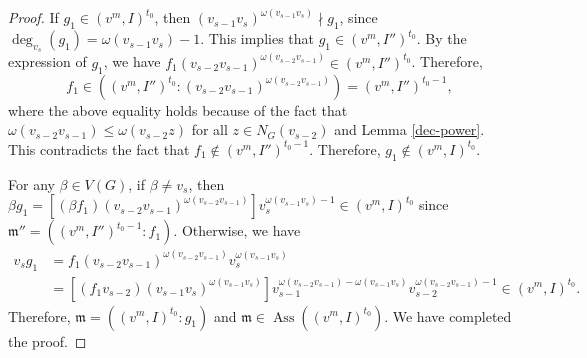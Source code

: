 \documentclass[12pt,amscd]{amsart}
\DeclareMathOperator{\ass}{Ass}
\theoremstyle{definition}
\def\m {\mathfrak m}
\begin{document}
\begin{proof}
If  $g_1\in (v^m,I)^{t_0}$, then  $(v_{s-1}v_{s})^{\omega(v_{s-1}v_{s})}\nmid g_1$, since  $\deg_{v_{s}}(g_1) = \omega(v_{s-1}v_{s})-1$. This implies that  $g_1 \in (v^m,I'')^{t_0}$.
By the expression of $g_1$, we have $f_1(v_{s-2}v_{s-1})^{\omega(v_{s-2}v_{s-1})} \in (v^m,I'')^{t_0}$.
Therefore, \[
 f_1\in ((v^m,I'')^{t_0} \colon (v_{s-2}v_{s-1})^{\omega(v_{s-2}v_{s-1})}) = (v^m,I'')^{t_0-1},
 \]
where the above equality holds because of the fact that $\omega(v_{s-2}v_{s-1}) \leqslant \omega(v_{s-2} z)$  for all  $z\in N_G(v_{s-2})$ and Lemma \ref{dec-power}. 
This contradicts the fact that  $f_1\notin  (v^m,I'')^{t_0-1}$. Therefore,  $g_1\notin (v^m,I)^{t_0}$.

For any $\beta \in V(G)$, if $\beta \ne v_{s}$, then
$\beta g_1 =[(\beta f_1)(v_{s-2}v_{s-1})^{\omega(v_{s-2}v_{s-1})}]v_s^{\omega(v_{s-1}v_{s})-1} \in (v^m,I)^{t_0}$
since  $\m'' = ((v^m,I'')^{t_0-1}\colon f_1)$. Otherwise, we have 
\begin{align*}
	v_{s}g_1& =f_1(v_{s-2}v_{s-1})^{\omega(v_{s-2}v_{s-1})}v_{s}^{\omega(v_{s-1}v_{s})}\\
	&= [(f_1v_{s-2})(v_{s-1}v_{s})^{\omega(v_{s-1}v_{s})}]v_{s-1}^{\omega(v_{s-2}v_{s-1})-\omega(v_{s-1}v_{s})}v_{s-2}^{\omega(v_{s-2}v_{s-1})-1}  \in (v^m,I)^{t_0}.
\end{align*}
Therefore, $\m = ((v^m,I)^{t_0}\colon g_1)$ and  $\m \in \ass((v^m,I)^{t_0})$. We  have completed  the proof.
\end{proof}
\end{document}
